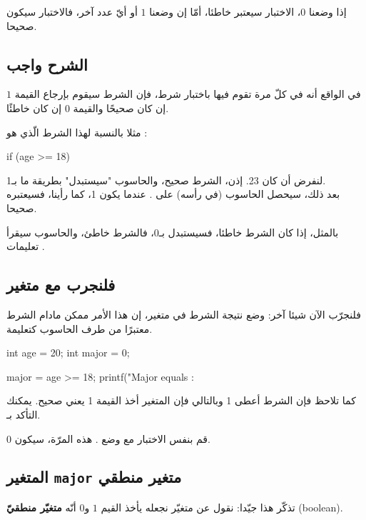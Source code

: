 إذا وضعنا $ 0 $، الاختبار سيعتبر خاطئا، أمّا إن وضعنا $ 1 $ أو أيّ عدد آخر، فالاختبار سيكون صحيحا.

\subsection{الشرح واجب}

في الواقع أنه في كلّ مرة تقوم فيها باختبار شرط، فإن الشرط سيقوم بإرجاع القيمة $ 1 $ إن كان صحيحًا والقيمة $ 0 $ إن كان خاطئًا.

مثلا بالنسبة لهذا الشرط الّذي هو
:

\begin{Csource}
if (age >= 18)
\end{Csource}

لنفرض أن
كان 23. إذن، الشرط صحيح، والحاسوب "سيستبدل" بطريقة ما
بـ1.\\
بعد ذلك، سيحصل الحاسوب (في رأسه) على
.
عندما يكون 1، كما رأينا، فسيعتبره صحيحا.

بالمثل، إذا كان الشرط خاطئا، فسيستبدل
بـ0، فالشرط خاطئ، والحاسوب سيقرأ تعليمات
.

\subsection{فلنجرب مع متغير}

فلنجرّب الآن شيئا آخر: وضع نتيجة الشرط في متغير، إن هذا الأمر ممكن مادام الشرط معتبرًا من طرف الحاسوب كتعليمة.

\begin{Csource}
int age = 20;
int major = 0;

major = age >= 18;
printf("Major equals : %
\end{Csource}

كما تلاحظ فإن الشرط
أعطى 1 وبالتالي فإن المتغير 
أخذ القيمة 1 يعني صحيح. يمكنك التأكد بـ.

قم بنفس الاختبار مع وضع
.
هذه المرّة،
سيكون 0.

\subsection{المتغير
\texttt{major}
متغير منطقي}

تذكّر هذا جيّدا: نقول عن متغيّر نجعله يأخذ القيم $ 1 $ و$ 0 $ أنّه
\textbf{متغيّر منطقيّ}
(\textenglish{boolean}).

